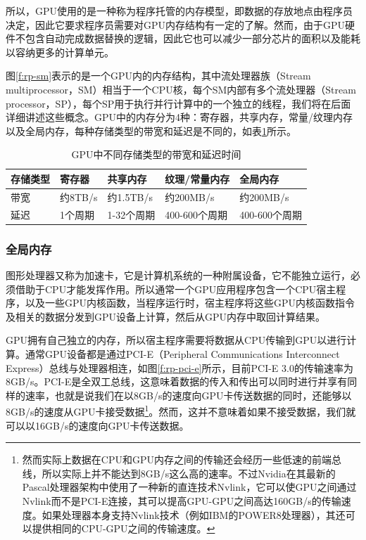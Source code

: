所以，GPU使用的是一种称为程序托管的内存模型，即数据的存放地点由程序员决定，因此它要求程序员需要对GPU内存结构有一定的了解。然而，由于GPU硬件不包含自动完成数据替换的逻辑，因此它也可以减少一部分芯片的面积以及能耗以容纳更多的计算单元。

图\ref{f:rp-sm}表示的是一个GPU内的内存结构，其中流处理器族（Stream multiprocessor，SM）相当于一个CPU核，每个SM内部有多个流处理器（Stream processor，SP），每个SP用于执行并行计算中的一个独立的线程，我们将在后面详细讲述这些概念。GPU中的内存分为4种：寄存器，共享内存，常量/纹理内存以及全局内存，每种存储类型的带宽和延迟是不同的，如表\ref{t:rp-gpu-memory}所示。

\begin{table}
\caption{GPU中不同存储类型的带宽和延迟时间}
\label{t:rp-gpu-memory}

\begin{tabular}{p{}|p{}|p{}|p{}|p{}}
\hline 
   存储类型&寄存器&共享内存&纹理/常量内存&全局内存  \\
    \hline  
 带宽&约8TB/s&约1.5TB/s&约200MB/s&约200MB/s\\
 延迟&1个周期&1-32个周期&400-600个周期&400-600个周期\\
 \hline 
\end{tabular}
\end{table}







\subsubsection{全局内存}
图形处理器又称为加速卡，它是计算机系统的一种附属设备，它不能独立运行，必须借助于CPU才能发挥作用。所以通常一个GPU应用程序包含一个CPU宿主程序，以及一些GPU内核函数，当程序运行时，宿主程序将这些GPU内核函数指令及相关的数据分发到GPU设备上计算，然后从GPU内存中取回计算结果。

GPU拥有自己独立的内存，所以宿主程序需要将数据从CPU传输到GPU以进行计算。通常GPU设备都是通过PCI-E（Peripheral Communications Interconnect Express）总线与处理器相连，如图\ref{f:rp-pci-e}所示，目前PCI-E 3.0的传输速率为8GB/s。PCI-E是全双工总线，这意味着数据的传入和传出可以同时进行并享有同样的速率，也就是说我们在以8GB/s的速度向GPU卡传送数据的同时，还能够以8GB/s的速度从GPU卡接受数据\footnote{然而实际上数据在CPU和GPU内存之间的传输还会经历一些低速的前端总线，所以实际上并不能达到8GB/s这么高的速率。不过Nvidia在其最新的Pascal处理器架构\cite{a:PascalArchitectureWhitepaper}中使用了一种新的直连技术Nvlink，它可以使GPU之间通过Nvlink而不是PCI-E连接，其可以提高GPU-GPU之间高达160GB/s的传输速度。如果处理器本身支持Nvlink技术（例如IBM的POWER8处理器），其还可以提供相同的CPU-GPU之间的传输速度。}。然而，这并不意味着如果不接受数据，我们就可以以16GB/s的速度向GPU卡传送数据。

